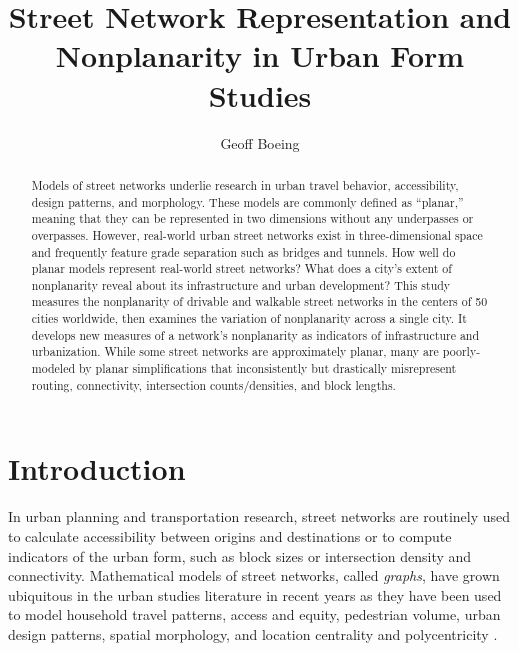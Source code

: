 \documentclass[Afour,sageh,times]{sagej}
\begin{document}
\title{Street Network Representation and Nonplanarity in Urban Form Studies}
\author{Geoff Boeing }


\begin{abstract}

Models of street networks underlie research in urban travel behavior, accessibility, design patterns, and morphology. These models are commonly defined as \enquote{planar,} meaning that they can be represented in two dimensions without any underpasses or overpasses. However, real-world urban street networks exist in three-dimensional space and frequently feature grade separation such as bridges and tunnels. How well do planar models represent real-world street networks? What does a city's extent of nonplanarity reveal about its infrastructure and urban development? This study measures the nonplanarity of drivable and walkable street networks in the centers of 50 cities worldwide, then examines the variation of nonplanarity across a single city. It develops new measures of a network's nonplanarity as indicators of infrastructure and urbanization. While some street networks are approximately planar, many are poorly-modeled by planar simplifications that inconsistently but drastically misrepresent routing, connectivity, intersection counts/densities, and block lengths.

\end{abstract}


\maketitle

\section{Introduction}

In urban planning and transportation research, street networks are routinely used to calculate accessibility between origins and destinations or to compute indicators of the urban form, such as block sizes or intersection density and connectivity. Mathematical models of street networks, called \emph{graphs}, have grown ubiquitous in the urban studies literature in recent years as they have been used to model household travel patterns, access and equity, pedestrian volume, urban design patterns, spatial morphology, and location centrality and polycentricity \citep{marshall_street_2010,porta_alterations_2014,marshall_community_2014,hajrasouliha_impact_2015,parthasarathi_street_2015,knight_metrics_2015,gil_street_2016,zhong_revealing_2017}.
\end{document}
